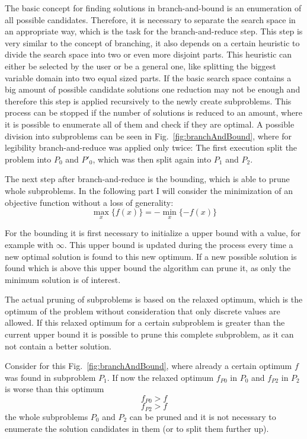 \documentclass[10pt,
               a4paper,
               journal,
               ]{IEEEtran}
\newcommand{\reffig}[1]{{Fig.~\ref{#1}}}
\begin{document}
	The basic concept for finding solutions in branch-and-bound is an enumeration of all possible candidates. Therefore, it is necessary to separate the search space in an appropriate way, which is the task for the branch-and-reduce step. This step is very similar to the concept of branching, it also depends on a certain heuristic to divide the search space into two or even more disjoint parts. This heuristic can either be selected by the user or be a general one, like splitting the biggest variable domain into two equal sized parts. If the basic search space contains a big amount of possible candidate solutions one reduction may not be enough and therefore this step is applied recursively to the newly create subproblems. This process can be stopped if the number of solutions is reduced to an amount, where it is possible to enumerate all of them and check if they are optimal. A possible division into subproblems can be seen in \reffig{fig:branchAndBound}, where for legibility branch-and-reduce was applied only twice: The first execution split the problem into $P_0$ and $P'_0$, which was then split again into $P_1$ and $P_2$.
	
	The next step after branch-and-reduce is the bounding, which is able to prune whole subproblems. In the following part I will consider the minimization of an objective function without a loss of generality:
	\begin{equation}
		\max_x \{f(x)\} = -\min_x \{-f(x)\}
	\end{equation}
	
	For the bounding it is first necessary to initialize a upper bound with a value, for example with $\infty$. This upper bound is updated during the process every time a new optimal solution is found to this new optimum. If a new possible solution is found which is above this upper bound the algorithm can prune it, as only the minimum solution is of interest. 
	
	The actual pruning of subproblems is based on the relaxed optimum, which is the optimum of the problem without consideration that only discrete values are allowed. If this relaxed optimum for a certain subproblem is greater than the current upper bound it is possible to prune this complete subproblem, as it can not contain a better solution.
	
	Consider for this \reffig{fig:branchAndBound}, where already a certain optimum $f$ was found in subproblem $P_1$. If now the relaxed optimum $f_{P0}$ in $P_0$ and $f_{P2}$ in $P_2$ is worse than this optimum
	\begin{equation}
		f_{P0} > f
	\end{equation}
	\begin{equation}
		f_{P2} > f
	\end{equation}
	the whole subproblems $P_{0}$ and $P_{2}$ can be pruned and it is not necessary to enumerate the solution candidates in them (or to split them further up).
	
\end{document}
